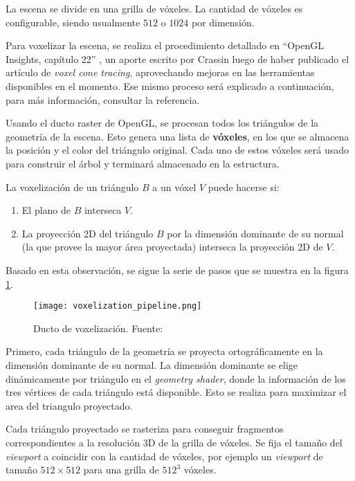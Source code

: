 La escena se divide en una grilla de vóxeles.
La cantidad de vóxeles es configurable, siendo usualmente $512$ o $1024$ por dimensión.

Para voxelizar la escena, se realiza el procedimiento detallado en ``OpenGL Insights, capítulo 22'' \cite{opengl-insights}, un aporte escrito por Crassin luego de haber publicado el artículo de \textit{voxel cone tracing}, aprovechando mejoras en las herramientas disponibles en el momento.
Ese mismo proceso será explicado a continuación, para más información, consultar la referencia.

Usando el ducto raster de OpenGL, se procesan todos los triángulos de la geometría de la escena.
Esto genera una lista de \textbf{vóxeles}, en los que se almacena la posición y el color del triángulo original.
Cada uno de estos vóxeles será usado para construir el árbol y terminará almacenado en la estructura.

La voxelización de un triángulo $B$ a un vóxel $V$ puede hacerse si:

\begin{enumerate}
    \item El plano de $B$ interseca $V$.
    \item La proyección 2D del triángulo $B$ por la dimensión dominante de su normal (la que provee la mayor área proyectada) interseca la proyección 2D de $V$.
\end{enumerate}

Basado en esta observación, se sigue la serie de pasos que se muestra en la figura \ref{fig:voxelization_pipeline}.

\begin{figure}[h!]
    \centering
    \texttt{[image: voxelization\_pipeline.png]}
    \caption{Ducto de voxelización. Fuente: \cite{opengl-insights}}
    \label{fig:voxelization_pipeline}
\end{figure}

Primero, cada triángulo de la geometría se proyecta ortográficamente en la dimensión dominante de su normal.
La dimensión dominante se elige dinámicamente por triángulo en el \textit{geometry shader}, donde la información de los tres vértices de cada triángulo está disponible.
Esto se realiza para maximizar el area del triangulo proyectado.

Cada triángulo proyectado se rasteriza para conseguir fragmentos correspondientes a la resolución 3D de la grilla de vóxeles.
Se fija el tamaño del \textit{viewport} a coincidir con la cantidad de vóxeles, por ejemplo un \textit{viewport} de tamaño $512\times512$ para una grilla de $512^3$ vóxeles.

